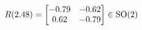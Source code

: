 \documentclass[preview]{standalone}
\begin{document}
\begin{align*}
\special{dvisvgm:raw <g id='unique000'>}R(2.48) = \begin{bmatrix} -0.79 & -0.62 \\ 0.62 & -0.79 \end{bmatrix} \in \text{SO}(2)\special{dvisvgm:raw </g>}
\end{align*}
\end{document}
